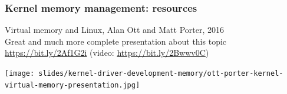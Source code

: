 \begin{frame}
  \frametitle{Kernel memory management: resources}
  Virtual memory and Linux, Alan Ott and Matt Porter, 2016\\
  Great and much more complete presentation about this topic\\
  \url{https://bit.ly/2Af1G2i} (video: \url{https://bit.ly/2Bwwv0C})
  \begin{center}
     \texttt{[image: slides/kernel-driver-development-memory/ott-porter-kernel-virtual-memory-presentation.jpg]}
  \end{center}
\end{frame}
